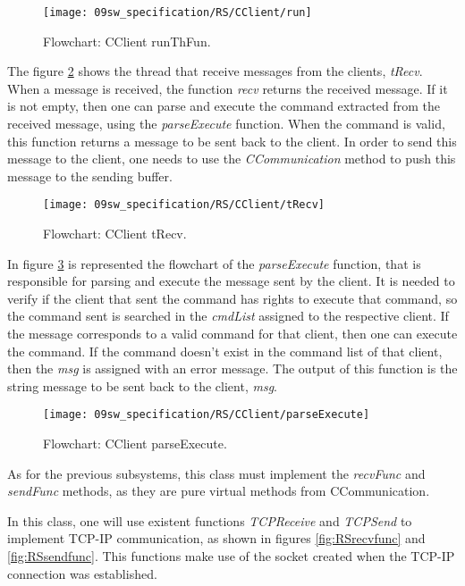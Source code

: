 \begin{figure}[H]
	\centering
	\texttt{[image: 09sw\_specification/RS/CClient/run]}
	\caption{Flowchart: CClient runThFun.}
	\label{fig:clientRun}
\end{figure}

The figure \ref{fig:RSRecv} shows the thread that receive messages from the clients, \textit{tRecv}. When a message is received, the function \textit{recv} returns the received message. If it is not empty, then one can parse and execute the command extracted from the received message, using the \textit{parseExecute} function. When the command is valid, this function returns a message to be sent back to the client. In order to send this message to the client, one needs to use the \textit{CCommunication} method to push this message to the sending buffer.

\begin{figure}[H]
	\centering
	\texttt{[image: 09sw\_specification/RS/CClient/tRecv]}
	\caption{Flowchart: CClient tRecv.}
	\label{fig:RSRecv}
\end{figure}

In figure \ref{fig:parseExecute} is represented the flowchart of the \textit{parseExecute} function, that is responsible for parsing and execute the message sent by the client. It is needed to verify if the client that sent the command has rights to execute that command, so the command sent is searched in the \textit{cmdList} assigned to the respective client. If the message corresponds to a valid command for that client, then one can execute the command. If the command doesn't exist in the command list of that client, then the \textit{msg} is assigned with an error message. The output of this function is the string message to be sent back to the client, \textit{msg}.

\begin{figure}[H]
	\centering
	\texttt{[image: 09sw\_specification/RS/CClient/parseExecute]}
	\caption{Flowchart: CClient parseExecute.}
	\label{fig:parseExecute}
\end{figure}

As for the previous subsystems, this class must implement the \textit{recvFunc} and \textit{sendFunc} methods, as they are pure virtual methods from CCommunication. 

In this class, one will use existent functions \textit{TCPReceive} and \textit{TCPSend} to implement TCP-IP communication, as shown in figures \ref{fig:RSrecvfunc} and \ref{fig:RSsendfunc}. This functions make use of the socket created when the TCP-IP connection was established.

